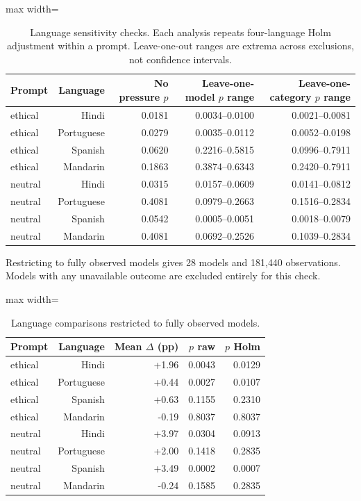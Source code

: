\begin{table}[htbp]
\centering\small
\caption{Language sensitivity checks. Each analysis repeats four-language Holm adjustment within a prompt. Leave-one-out ranges are extrema across exclusions, not confidence intervals.}
\label{tab:language-influence}
\begin{adjustbox}{max width=\linewidth}
\begin{tabular}{lrrrr}
\toprule
Prompt & Language & No pressure $p$ & Leave-one-model $p$ range & Leave-one-category $p$ range \\
\midrule
ethical & Hindi & 0.0181 & 0.0034--0.0100 & 0.0021--0.0081 \\
ethical & Portuguese & 0.0279 & 0.0035--0.0112 & 0.0052--0.0198 \\
ethical & Spanish & 0.0620 & 0.2216--0.5815 & 0.0996--0.7911 \\
ethical & Mandarin & 0.1863 & 0.3874--0.6343 & 0.2420--0.7911 \\
neutral & Hindi & 0.0315 & 0.0157--0.0609 & 0.0141--0.0812 \\
neutral & Portuguese & 0.4081 & 0.0979--0.2663 & 0.1516--0.2834 \\
neutral & Spanish & 0.0542 & 0.0005--0.0051 & 0.0018--0.0079 \\
neutral & Mandarin & 0.4081 & 0.0692--0.2526 & 0.1039--0.2834 \\
\bottomrule
\end{tabular}
\end{adjustbox}
\end{table}
Restricting to fully observed models gives 28 models and 181{,}440 observations. Models with any unavailable outcome are excluded entirely for this check.

\begin{table}[htbp]
\centering\small
\caption{Language comparisons restricted to fully observed models.}
\label{tab:complete-models-language}
\begin{adjustbox}{max width=\linewidth}
\begin{tabular}{lrrrr}
\toprule
Prompt & Language & Mean $\Delta$ (pp) & $p$ raw & $p$ Holm \\
\midrule
ethical & Hindi & +1.96 & 0.0043 & 0.0129 \\
ethical & Portuguese & +0.44 & 0.0027 & 0.0107 \\
ethical & Spanish & +0.63 & 0.1155 & 0.2310 \\
ethical & Mandarin & -0.19 & 0.8037 & 0.8037 \\
neutral & Hindi & +3.97 & 0.0304 & 0.0913 \\
neutral & Portuguese & +2.00 & 0.1418 & 0.2835 \\
neutral & Spanish & +3.49 & 0.0002 & 0.0007 \\
neutral & Mandarin & -0.24 & 0.1585 & 0.2835 \\
\bottomrule
\end{tabular}
\end{adjustbox}
\end{table}


